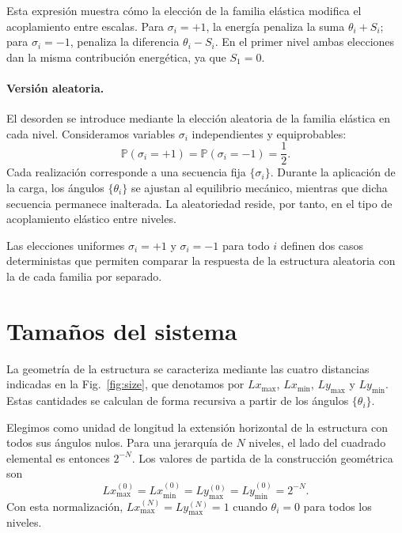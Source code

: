 \documentclass[11pt,a4paper]{article}
\begin{document}
Esta expresión muestra cómo la elección de la familia elástica
modifica el acoplamiento entre escalas. Para $\sigma_i=+1$, la energía
penaliza la suma $\theta_i+S_i$; para $\sigma_i=-1$, penaliza la
diferencia $\theta_i-S_i$. En el primer nivel ambas elecciones dan
la misma contribución energética, ya que $S_1=0$.

\paragraph{Versión aleatoria.}

El desorden se introduce mediante la elección aleatoria de la familia
elástica en cada nivel. Consideramos variables $\sigma_i$
independientes y equiprobables:
\begin{equation}
\mathbb{P}(\sigma_i=+1)
=
\mathbb{P}(\sigma_i=-1)
=
\frac12.
\label{eq:sigma_distribution}
\end{equation}
Cada realización corresponde a una secuencia fija $\{\sigma_i\}$.
Durante la aplicación de la carga, los ángulos $\{\theta_i\}$ se
ajustan al equilibrio mecánico, mientras que dicha secuencia
permanece inalterada. La aleatoriedad reside, por tanto, en el tipo
de acoplamiento elástico entre niveles.

Las elecciones uniformes $\sigma_i=+1$ y $\sigma_i=-1$ para todo $i$
definen dos casos deterministas que permiten comparar la respuesta
de la estructura aleatoria con la de cada familia por separado.


\section{Tamaños del sistema}
\label{sec:size}

La geometría de la estructura se caracteriza mediante las cuatro
distancias indicadas en la Fig.~\ref{fig:size}, que denotamos por
$Lx_{\max}$, $Lx_{\min}$, $Ly_{\max}$ y $Ly_{\min}$.
Estas cantidades se calculan de forma recursiva a partir de los
ángulos $\{\theta_i\}$.

Elegimos como unidad de longitud la extensión horizontal de la
estructura con todos sus ángulos nulos. Para una jerarquía de
$N$ niveles, el lado del cuadrado elemental es entonces $2^{-N}$.
Los valores de partida de la construcción geométrica son
\begin{equation}
Lx_{\max}^{(0)}=Lx_{\min}^{(0)}
=Ly_{\max}^{(0)}=Ly_{\min}^{(0)}=2^{-N}.
\label{eq:size_base}
\end{equation}
Con esta normalización,
$Lx_{\max}^{(N)}=Ly_{\max}^{(N)}=1$
cuando $\theta_i=0$ para todos los niveles.
\end{document}
